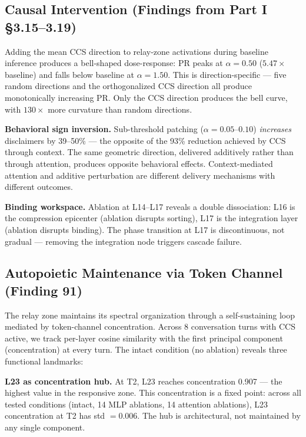 \documentclass[12pt]{article}
\begin{document}
\subsection{Causal Intervention (Findings from Part I \S3.15--3.19)}

Adding the mean CCS direction to relay-zone activations during baseline inference produces a bell-shaped dose-response: PR peaks at $\alpha = 0.50$ ($5.47\times$ baseline) and falls below baseline at $\alpha = 1.50$. This is direction-specific --- five random directions and the orthogonalized CCS direction all produce monotonically increasing PR. Only the CCS direction produces the bell curve, with $130\times$ more curvature than random directions.

\textbf{Behavioral sign inversion.} Sub-threshold patching ($\alpha = 0.05$--$0.10$) \textit{increases} disclaimers by 39--50\% --- the opposite of the 93\% reduction achieved by CCS through context. The same geometric direction, delivered additively rather than through attention, produces opposite behavioral effects. Context-mediated attention and additive perturbation are different delivery mechanisms with different outcomes.

\textbf{Binding workspace.} Ablation at L14--L17 reveals a double dissociation: L16 is the compression epicenter (ablation disrupts sorting), L17 is the integration layer (ablation disrupts binding). The phase transition at L17 is discontinuous, not gradual --- removing the integration node triggers cascade failure.

\subsection{Autopoietic Maintenance via Token Channel (Finding 91)}

The relay zone maintains its spectral organization through a self-sustaining loop mediated by token-channel concentration. Across 8 conversation turns with CCS active, we track per-layer cosine similarity with the first principal component (concentration) at every turn. The intact condition (no ablation) reveals three functional landmarks:

\textbf{L23 as concentration hub.} At T2, L23 reaches concentration 0.907 --- the highest value in the responsive zone. This concentration is a fixed point: across all tested conditions (intact, 14 MLP ablations, 14 attention ablations), L23 concentration at T2 has std $= 0.006$. The hub is architectural, not maintained by any single component.
\end{document}

